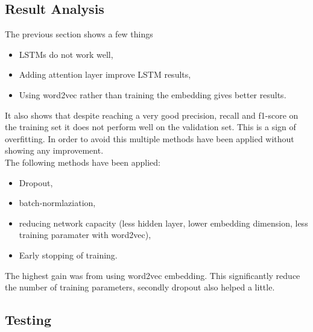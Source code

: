 \subsection{Result Analysis}
The previous section shows a few things
\begin{itemize}
	\item LSTMs do not work well,
	\item Adding attention layer improve LSTM results,
	\item Using word2vec rather than training the embedding gives better results.
\end{itemize}

It also shows that despite reaching a very good precision, recall and f1-score on the training set it does not perform well on the validation set. This is a sign of overfitting. In order to avoid this multiple methods have been applied without showing any improvement. \\

The following methods have been applied: 
\begin{itemize}
	\item Dropout\cite{srivastava2014dropout}, 
	\item batch-normlaziation\cite{Ioffe2015},
	\item reducing network capacity (less hidden layer, lower embedding dimension, less training paramater with word2vec),
	\item Early stopping of training.
\end{itemize}

The highest gain was from using word2vec embedding. This significantly reduce the number of training parameters, secondly dropout also helped a little. 

\subsection{Testing}